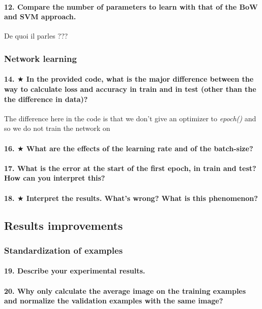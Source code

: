 \documentclass{article}
\theoremstyle{plain}%
\theoremstyle{definition}
\theoremstyle{remark}
\begin{document}
\paragraph{12. Compare the number of parameters to learn with that of the BoW and SVM approach.}
De quoi il parles ???

\subsubsection{Network learning}
\paragraph{14. $ \bigstar $ In the provided code, what is the major difference between the way to calculate loss and accuracy in train and in test (other than the the difference in data)?}
The difference here in the code is that we don't give an optimizer to \textit{epoch()} and so we do not train the network on 

\paragraph{16. $ \bigstar $ What are the effects of the learning rate and of the batch-size?}

\paragraph{17. What is the error at the start of the first epoch, in train and test? How can you interpret this?}

\paragraph{18. $ \bigstar $ Interpret the results. What's wrong? What is this phenomenon?}

\subsection{Results improvements}
\subsubsection{Standardization of examples}
\paragraph{19. Describe your experimental results.}

\paragraph{20. Why only calculate the average image on the training examples and normalize the validation examples with the same image?}
\end{document}
